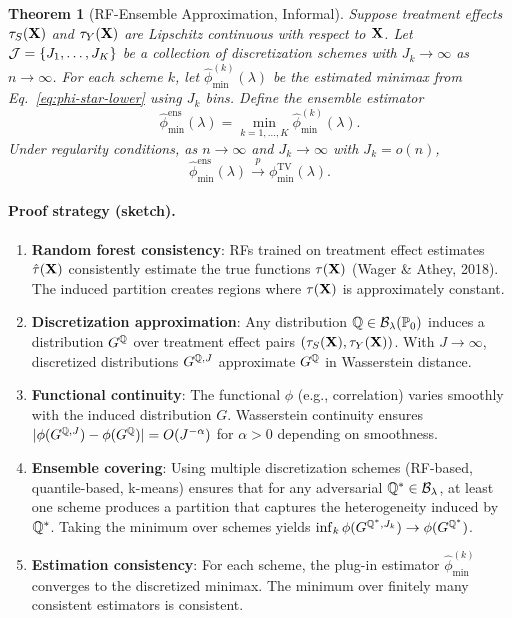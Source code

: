 \documentclass{article}
\newtheorem{theorem}{Theorem}
\newcommand{\PP}{\mathbb{P}}
\begin{document}
\begin{theorem}[RF-Ensemble Approximation, Informal]\label{thm:rf-ensemble}
Suppose treatment effects $\tau_S(\mathbf{X})$ and $\tau_Y(\mathbf{X})$ are Lipschitz continuous with respect to $\mathbf{X}$. Let $\mathcal{J} = \{J_1, \ldots, J_K\}$ be a collection of discretization schemes with $J_k \to \infty$ as $n \to \infty$. For each scheme $k$, let $\hat{\phi}_{\min}^{(k)}(\lambda)$ be the estimated minimax from Eq.~\eqref{eq:phi-star-lower} using $J_k$ bins. Define the ensemble estimator
\[
    \hat{\phi}_{\min}^{\mathrm{ens}}(\lambda) = \min_{k=1,\ldots,K} \hat{\phi}_{\min}^{(k)}(\lambda).
\]
Under regularity conditions, as $n \to \infty$ and $J_k \to \infty$ with $J_k = o(n)$,
\[
    \hat{\phi}_{\min}^{\mathrm{ens}}(\lambda) \xrightarrow{p} \phi_{\min}^{\mathrm{TV}}(\lambda).
\]
\end{theorem}

\paragraph{Proof strategy (sketch).}
\begin{enumerate}
    \item \textbf{Random forest consistency}: RFs trained on treatment effect estimates $\hat{\tau}(\mathbf{X})$ consistently estimate the true functions $\tau(\mathbf{X})$ (Wager \& Athey, 2018). The induced partition creates regions where $\tau(\mathbf{X})$ is approximately constant.

    \item \textbf{Discretization approximation}: Any distribution $\Q \in \cB_\lambda(\PP_0)$ induces a distribution $G^{\mathbb{Q}}$ over treatment effect pairs $(\tau_S(\mathbf{X}), \tau_Y(\mathbf{X}))$. With $J \to \infty$, discretized distributions $G^{\mathbb{Q}, J}$ approximate $G^{\mathbb{Q}}$ in Wasserstein distance.

    \item \textbf{Functional continuity}: The functional $\phi$ (e.g., correlation) varies smoothly with the induced distribution $G$. Wasserstein continuity ensures $|\phi(G^{\mathbb{Q}, J}) - \phi(G^{\mathbb{Q}})| = O(J^{-\alpha})$ for $\alpha > 0$ depending on smoothness.

    \item \textbf{Ensemble covering}: Using multiple discretization schemes (RF-based, quantile-based, k-means) ensures that for any adversarial $\mathbb{Q}^* \in \mathcal{B}_\lambda$, at least one scheme produces a partition that captures the heterogeneity induced by $\mathbb{Q}^*$. Taking the minimum over schemes yields $\inf_k \phi(G^{\mathbb{Q}^*, J_k}) \to \phi(G^{\mathbb{Q}^*})$.

    \item \textbf{Estimation consistency}: For each scheme, the plug-in estimator $\hat{\phi}_{\min}^{(k)}$ converges to the discretized minimax. The minimum over finitely many consistent estimators is consistent.
\end{enumerate}
\end{document}
